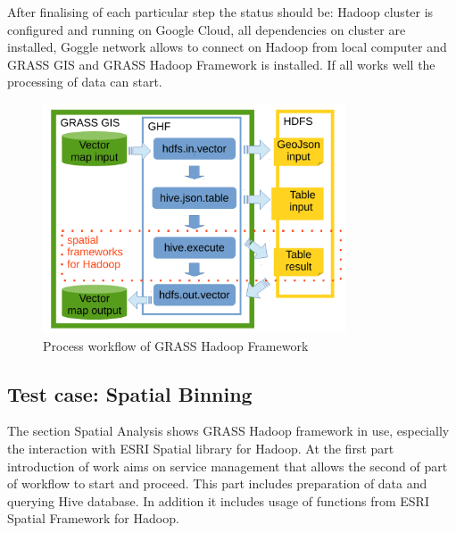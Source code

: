 \documentclass[a4paper,12pt,oneside]{report}
\begin{document}
	After finalising of each particular step the status should be: Hadoop cluster is configured and running on Google Cloud, all dependencies on cluster are installed, Goggle network allows to connect on Hadoop from local computer and GRASS GIS and GRASS Hadoop Framework is installed. If all works well the processing of data can start. 
		\begin{figure}[!htbp]
			\centering
			\includegraphics[width=0.8\textwidth]{./img/modules_schema.pdf}
			\caption[GHF workflow]{\centering Process workflow of GRASS Hadoop Framework 
			}
			\label{wokrflow}
		\end{figure} 
		
	
	        \subsection{Test case: Spatial Binning}\label{spatial_anal_usage}
	The section Spatial Analysis shows GRASS Hadoop framework in use, especially 
	the interaction with ESRI Spatial library for Hadoop. 
	At the first part introduction of work aims on service management that allows 
	the second of part of workflow to start and proceed. This part includes preparation of data
	and querying Hive database. In addition it includes usage of functions from ESRI
	Spatial Framework for Hadoop.
	
\end{document}
